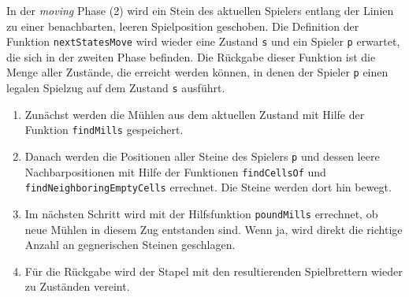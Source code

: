 \documentclass[11pt]{article}
\providecommand{\tightlist}{%
      \setlength{\itemsep}{0pt}\setlength{\parskip}{0pt}}
\begin{document}
    In der \emph{moving} Phase (2) wird ein Stein des aktuellen Spielers
entlang der Linien zu einer benachbarten, leeren Spielposition
geschoben. Die Definition der Funktion \texttt{nextStatesMove} wird
wieder eine Zustand \texttt{s} und ein Spieler \texttt{p} erwartet, die
sich in der zweiten Phase befinden. Die Rückgabe dieser Funktion ist die
Menge aller Zustände, die erreicht werden können, in denen der Spieler
\texttt{p} einen legalen Spielzug auf dem Zustand \texttt{s} ausführt.

\begin{enumerate}
\def\labelenumi{\arabic{enumi}.}
\tightlist
\item
  Zunächst werden die Mühlen aus dem aktuellen Zustand mit Hilfe der
  Funktion \texttt{findMills} gespeichert.
\item
  Danach werden die Positionen aller Steine des Spielers \texttt{p} und
  dessen leere Nachbarpositionen mit Hilfe der Funktionen
  \texttt{findCellsOf} und \texttt{findNeighboringEmptyCells} errechnet.
  Die Steine werden dort hin bewegt.
\item
  Im nächsten Schritt wird mit der Hilfsfunktion \texttt{poundMills}
  errechnet, ob neue Mühlen in diesem Zug entstanden sind. Wenn ja, wird
  direkt die richtige Anzahl an gegnerischen Steinen geschlagen.
\item
  Für die Rückgabe wird der Stapel mit den resultierenden Spielbrettern
  wieder zu Zuständen vereint.
\end{enumerate}
\end{document}

